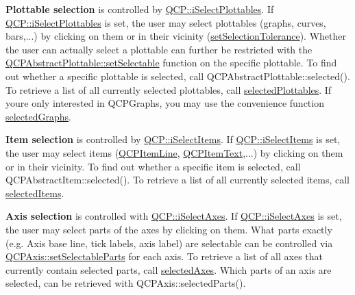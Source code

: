 {\bfseries Plottable selection} is controlled by \hyperlink{namespaceQCP_a2ad6bb6281c7c2d593d4277b44c2b037a67148c8227b4155eca49135fc274c7ec}{Q\+C\+P\+::i\+Select\+Plottables}. If \hyperlink{namespaceQCP_a2ad6bb6281c7c2d593d4277b44c2b037a67148c8227b4155eca49135fc274c7ec}{Q\+C\+P\+::i\+Select\+Plottables} is set, the user may select plottables (graphs, curves, bars,...) by clicking on them or in their vicinity (\hyperlink{classQCustomPlot_a4dc31241d7b09680950e19e5f971ed93}{set\+Selection\+Tolerance}). Whether the user can actually select a plottable can further be restricted with the \hyperlink{classQCPAbstractPlottable_a22c69299eb5569e0f6bf084877a37dc4}{Q\+C\+P\+Abstract\+Plottable\+::set\+Selectable} function on the specific plottable. To find out whether a specific plottable is selected, call Q\+C\+P\+Abstract\+Plottable\+::selected(). To retrieve a list of all currently selected plottables, call \hyperlink{classQCustomPlot_a6721b8c689bb7f2f400987e580508fe8}{selected\+Plottables}. If you\textquotesingle{}re only interested in Q\+C\+P\+Graphs, you may use the convenience function \hyperlink{classQCustomPlot_ad2a0493bdd01e7aa99a4209ae3a5b67b}{selected\+Graphs}.

{\bfseries Item selection} is controlled by \hyperlink{namespaceQCP_a2ad6bb6281c7c2d593d4277b44c2b037aea2f7c105d674e76d9b187b02ef29260}{Q\+C\+P\+::i\+Select\+Items}. If \hyperlink{namespaceQCP_a2ad6bb6281c7c2d593d4277b44c2b037aea2f7c105d674e76d9b187b02ef29260}{Q\+C\+P\+::i\+Select\+Items} is set, the user may select items (\hyperlink{classQCPItemLine}{Q\+C\+P\+Item\+Line}, \hyperlink{classQCPItemText}{Q\+C\+P\+Item\+Text},...) by clicking on them or in their vicinity. To find out whether a specific item is selected, call Q\+C\+P\+Abstract\+Item\+::selected(). To retrieve a list of all currently selected items, call \hyperlink{classQCustomPlot_a1a48b13547e2d9ac5cd6927516f47a2e}{selected\+Items}.

{\bfseries Axis selection} is controlled with \hyperlink{namespaceQCP_a2ad6bb6281c7c2d593d4277b44c2b037ad6644ac55bef621645326e9dd7469caa}{Q\+C\+P\+::i\+Select\+Axes}. If \hyperlink{namespaceQCP_a2ad6bb6281c7c2d593d4277b44c2b037ad6644ac55bef621645326e9dd7469caa}{Q\+C\+P\+::i\+Select\+Axes} is set, the user may select parts of the axes by clicking on them. What parts exactly (e.\+g. Axis base line, tick labels, axis label) are selectable can be controlled via \hyperlink{classQCPAxis_a513f9b9e326c505d9bec54880031b085}{Q\+C\+P\+Axis\+::set\+Selectable\+Parts} for each axis. To retrieve a list of all axes that currently contain selected parts, call \hyperlink{classQCustomPlot_aa6baf867e8beb96ed5bd471f83ece903}{selected\+Axes}. Which parts of an axis are selected, can be retrieved with Q\+C\+P\+Axis\+::selected\+Parts().

